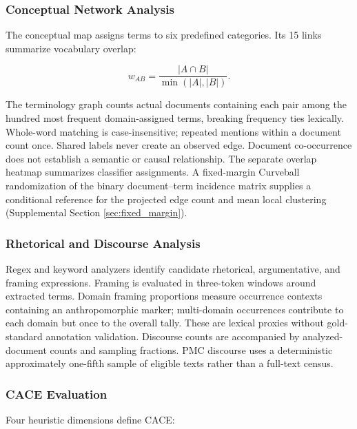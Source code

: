 \documentclass[
]{article}
\numberwithin{equation}{section}
\begin{document}
\subsubsection{Conceptual Network
Analysis}\label{conceptual-network-analysis}

The conceptual map assigns terms to six predefined categories. Its 15
links summarize vocabulary overlap:

\begin{equation}\label{eq:overlap_coefficient}
w_{AB}=\frac{|A\cap B|}{\min(|A|,|B|)}.
\end{equation}

The terminology graph counts actual documents containing each pair among
the hundred most frequent domain-assigned terms, breaking frequency ties
lexically. Whole-word matching is case-insensitive; repeated mentions
within a document count once. Shared labels never create an observed
edge. Document co-occurrence does not establish a semantic or causal
relationship. The separate overlap heatmap summarizes classifier
assignments. A fixed-margin Curveball randomization of the binary
document--term incidence matrix supplies a conditional reference for the
projected edge count and mean local clustering (Supplemental Section
\ref{sec:fixed_margin}).

\subsubsection{Rhetorical and Discourse
Analysis}\label{rhetorical-and-discourse-analysis}

Regex and keyword analyzers identify candidate rhetorical,
argumentative, and framing expressions. Framing is evaluated in
three-token windows around extracted terms. Domain framing proportions
measure occurrence contexts containing an anthropomorphic marker;
multi-domain occurrences contribute to each domain but once to the
overall tally. These are lexical proxies without gold-standard
annotation validation. Discourse counts are accompanied by
analyzed-document counts and sampling fractions. PMC discourse uses a
deterministic approximately one-fifth sample of eligible texts rather
than a full-text census.

\subsubsection{CACE Evaluation}\label{cace-evaluation}

Four heuristic dimensions define CACE:
\end{document}
